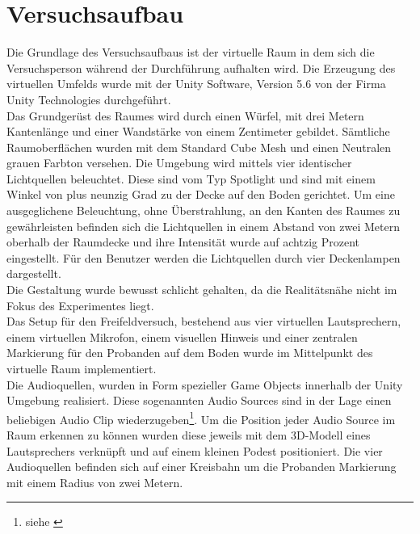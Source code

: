 
\section{Versuchsaufbau}
Die Grundlage des Versuchsaufbaus ist der virtuelle Raum in dem sich die Versuchsperson während der Durchführung aufhalten wird. Die Erzeugung des virtuellen Umfelds wurde mit der Unity Software, Version 5.6 von der Firma Unity Technologies durchgeführt.\\%
Das Grundgerüst des Raumes wird durch einen Würfel, mit drei Metern Kantenlänge und einer Wandstärke von einem Zentimeter gebildet. Sämtliche Raumoberflächen wurden mit dem Standard Cube Mesh und einen Neutralen grauen Farbton versehen. Die Umgebung wird mittels vier identischer Lichtquellen beleuchtet. Diese sind vom Typ Spotlight und sind mit einem Winkel von plus neunzig Grad zu der Decke auf den Boden gerichtet. Um eine ausgeglichene Beleuchtung, ohne Überstrahlung, an den Kanten des Raumes zu gewährleisten befinden sich die Lichtquellen in einem Abstand von zwei Metern oberhalb der Raumdecke und ihre Intensität wurde auf achtzig Prozent eingestellt. Für den Benutzer werden die Lichtquellen durch vier Deckenlampen dargestellt.\\
Die Gestaltung wurde bewusst schlicht gehalten, da die Realitätsnähe nicht im Fokus des Experimentes liegt.\\
Das Setup für den Freifeldversuch, bestehend aus vier virtuellen Lautsprechern, einem virtuellen Mikrofon, einem visuellen Hinweis und einer zentralen Markierung für den Probanden auf dem Boden wurde im Mittelpunkt des virtuelle Raum implementiert.\\
Die Audioquellen, wurden in Form spezieller Game Objects innerhalb der Unity Umgebung realisiert. Diese sogenannten Audio Sources sind in der Lage einen beliebigen Audio Clip wiederzugeben\footnote{siehe \cite{UnityManualAudioSource}}.%
Um die Position jeder Audio Source im Raum erkennen zu können wurden diese jeweils mit dem 3D-Modell eines Lautsprechers verknüpft und auf einem kleinen Podest positioniert. Die vier Audioquellen befinden sich auf einer Kreisbahn um die Probanden Markierung mit einem Radius von zwei Metern.

\newpage

